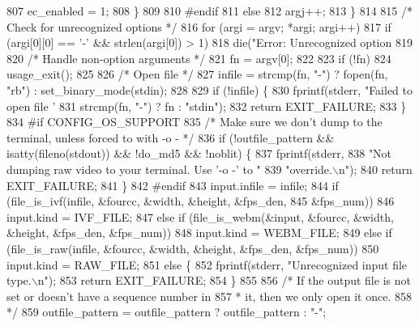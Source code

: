 \begin{DoxyCodeInclude}
{{{{{{{{{{{{{{{{{{{{{{{{807       ec\_enabled = 1;
808     \}
809 
810 \textcolor{preprocessor}{#endif}
811     \textcolor{keywordflow}{else}
812       argj++;
813   \}
814 
815   \textcolor{comment}{/* Check for unrecognized options */}
816   \textcolor{keywordflow}{for} (argi = argv; *argi; argi++)
817     \textcolor{keywordflow}{if} (argi[0][0] == \textcolor{charliteral}{'-'} && strlen(argi[0]) > 1)
818       die(\textcolor{stringliteral}{"Error: Unrecognized option %
819 
820   \textcolor{comment}{/* Handle non-option arguments */}
821   fn = argv[0];
822 
823   \textcolor{keywordflow}{if} (!fn)
824     usage\_exit();
825 
826   \textcolor{comment}{/* Open file */}
827   infile = strcmp(fn, \textcolor{stringliteral}{"-"}) ? fopen(fn, \textcolor{stringliteral}{"rb"}) : set\_binary\_mode(stdin);
828 
829   \textcolor{keywordflow}{if} (!infile) \{
830     fprintf(stderr, \textcolor{stringliteral}{"Failed to open file '%
831             strcmp(fn, \textcolor{stringliteral}{"-"}) ? fn : \textcolor{stringliteral}{"stdin"});
832     \textcolor{keywordflow}{return} EXIT\_FAILURE;
833   \}
834 \textcolor{preprocessor}{#if CONFIG\_OS\_SUPPORT}
835   \textcolor{comment}{/* Make sure we don't dump to the terminal, unless forced to with -o - */}
836   \textcolor{keywordflow}{if} (!outfile\_pattern && isatty(fileno(stdout)) && !do\_md5 && !noblit) \{
837     fprintf(stderr,
838             \textcolor{stringliteral}{"Not dumping raw video to your terminal. Use '-o -' to "}
839             \textcolor{stringliteral}{"override.\(\backslash\)n"});
840     \textcolor{keywordflow}{return} EXIT\_FAILURE;
841   \}
842 \textcolor{preprocessor}{#endif}
843   input.infile = infile;
844   \textcolor{keywordflow}{if} (file\_is\_ivf(infile, &fourcc, &width, &height, &fps\_den,
845                   &fps\_num))
846     input.kind = IVF\_FILE;
847   \textcolor{keywordflow}{else} \textcolor{keywordflow}{if} (file\_is\_webm(&input, &fourcc, &width, &height, &fps\_den, &fps\_num))
848     input.kind = WEBM\_FILE;
849   \textcolor{keywordflow}{else} \textcolor{keywordflow}{if} (file\_is\_raw(infile, &fourcc, &width, &height, &fps\_den, &fps\_num))
850     input.kind = RAW\_FILE;
851   \textcolor{keywordflow}{else} \{
852     fprintf(stderr, \textcolor{stringliteral}{"Unrecognized input file type.\(\backslash\)n"});
853     \textcolor{keywordflow}{return} EXIT\_FAILURE;
854   \}
855 
856   \textcolor{comment}{/* If the output file is not set or doesn't have a sequence number in}
857 \textcolor{comment}{   * it, then we only open it once.}
858 \textcolor{comment}{   */}
859   outfile\_pattern = outfile\_pattern ? outfile\_pattern : \textcolor{stringliteral}{"-"};
}}}}}}}}}}}}}}}}}}}}}}}}}}
\end{DoxyCodeInclude}
